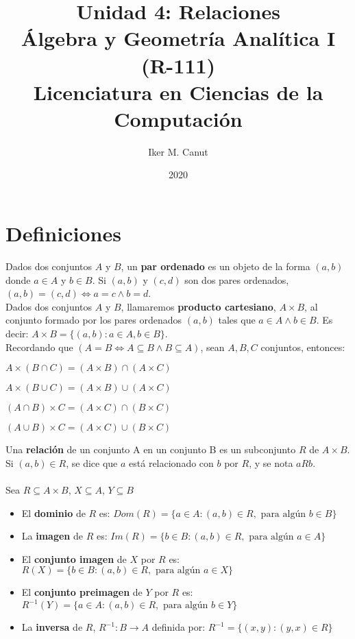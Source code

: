 \documentclass[11pt,a4paper]{article}
\author{Iker M. Canut}
\title{Unidad 4: Relaciones\\\'Algebra y Geometr\'ia Anal\'itica I (R-111)\\Licenciatura en Ciencias de la Computaci\'on}
\date{2020}
\begin{document}
\maketitle
\newpage

\section{Definiciones}
\noindent Dados dos conjuntos $A$ y $B$, un \textbf{par ordenado} es un objeto de la forma $(a,b)$ donde $a \in A$ y $b \in B$. Si $(a,b)$ y $(c,d)$ son dos pares ordenados, $(a,b) = (c,d) \iff a=c \land b=d$.\\

\noindent Dados dos conjuntos $A$ y $B$, llamaremos \textbf{producto cartesiano}, $A\times B$, al conjunto formado por los pares ordenados $(a,b)$ tales que $a\in A \land b\in B$. Es decir: $A\times B = \{(a,b):a\in A, b\in B\}$.\\

\noindent Recordando que $(A=B \iff A\subseteq B \land B\subseteq A)$, sean $A,B, C$ conjuntos, entonces:
\begin{itemize}
\begin{multicols}{2}
\item $A \times (B \cap C) = (A \times B) \cap (A \times C)$
\item $A \times (B \cup C) = (A \times B) \cup (A \times C)$
\item $(A \cap B) \times C = (A \times C) \cap (B \times C)$
\item $(A \cup B) \times C = (A \times C) \cup (B \times C)$
\end{multicols}
\end{itemize}


\noindent Una \textbf{relaci\'on} de un conjunto A en un conjunto B es un subconjunto $R$ de $A \times B$. Si $(a,b) \in R$, se dice que $a$ est\'a relacionado con $b$ por $R$, y se nota $aRb$.\\ \\

\noindent Sea $R \subseteq A \times B$, $X \subseteq A$, $Y \subseteq B$
\begin{itemize}
\item El \textbf{dominio} de $R$ es: \hfill $Dom(R) = \{ a \in A:(a,b) \in R, \text{ para alg\'un } b\in B \}$
\item La \textbf{imagen} de $R$ es: \hfill $Im(R) = \{ b\in B : (a,b)\in R, \text{ para alg\'un } a \in A \}$
\item El \textbf{conjunto imagen} de $X$ por $R$ es: \hfill $R(X) = \{ b\in B : (a,b) \in R, \text{ para alg\'un } a \in X \}$
\item El \textbf{conjunto preimagen} de $Y$ por $R$ es: \hfill $R^{-1}(Y) = \{ a\in A : (a,b) \in R, \text{ para alg\'un } b \in Y \}$
\item La \textbf{inversa} de $R$, $R^{-1}: B\rightarrow A$ definida por: \hfill $R^{-1} = \{ (x,y):(y,x) \in R \}$\\
\end{itemize}
\end{document}
